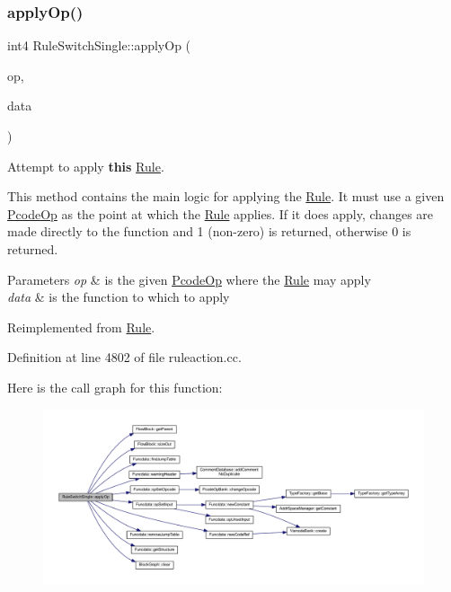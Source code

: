 \subsubsection{\texorpdfstring{applyOp()}{applyOp()}}
{\footnotesize\ttfamily int4 Rule\+Switch\+Single\+::apply\+Op (\begin{DoxyParamCaption}\item[{\mbox{\hyperlink{class_pcode_op}{Pcode\+Op}} $\ast$}]{op,  }\item[{\mbox{\hyperlink{class_funcdata}{Funcdata}} \&}]{data }\end{DoxyParamCaption})\hspace{0.3cm}{\ttfamily [virtual]}}



Attempt to apply {\bfseries{this}} \mbox{\hyperlink{class_rule}{Rule}}. 

This method contains the main logic for applying the \mbox{\hyperlink{class_rule}{Rule}}. It must use a given \mbox{\hyperlink{class_pcode_op}{Pcode\+Op}} as the point at which the \mbox{\hyperlink{class_rule}{Rule}} applies. If it does apply, changes are made directly to the function and 1 (non-\/zero) is returned, otherwise 0 is returned. 
\begin{DoxyParams}{Parameters}
{\em op} & is the given \mbox{\hyperlink{class_pcode_op}{Pcode\+Op}} where the \mbox{\hyperlink{class_rule}{Rule}} may apply \\
\hline
{\em data} & is the function to which to apply \\
\hline
\end{DoxyParams}


Reimplemented from \mbox{\hyperlink{class_rule_a4e3e61f066670175009f60fb9dc60848}{Rule}}.



Definition at line 4802 of file ruleaction.\+cc.

Here is the call graph for this function\+:
\nopagebreak
\begin{figure}[H]
\begin{center}
\leavevmode
\includegraphics[width=350pt]{class_rule_switch_single_ab884de26def65edb9ade3b981c6983e1_cgraph}
\end{center}
\end{figure}
\mbox{\label{class_rule_switch_single_ab260d5a864f7aa58bcaae9cd39050c23}} 
